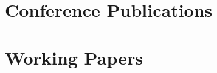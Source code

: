 \documentclass{article}
\begin{document}
    \section{Conference Publications}
    
    \begin{etaremune}
    	[itemsep=0.2ex,
    	leftmargin=4.8ex]
    	\renewcommand{\labelenumi}{C\theenumi.}
        
    \end{etaremune}

    
    
%        
%    
%   
    
    
    
    
    
    \section{Working Papers}
    \begin{etaremune}
    	[itemsep=0.2ex,
    	leftmargin=4.8ex]
    	\renewcommand{\labelenumi}{W\theenumi.}
        
    \end{etaremune}
\end{document}
